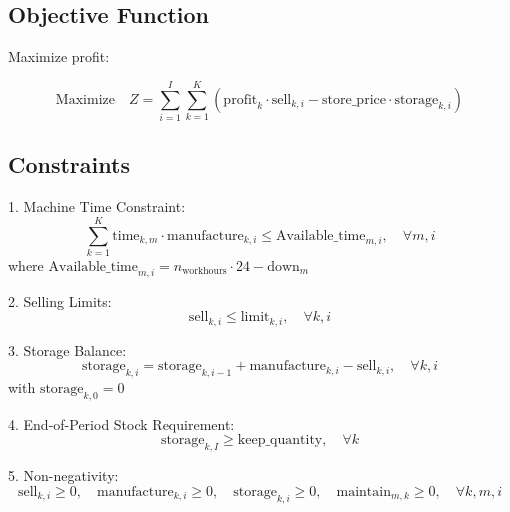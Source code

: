 \documentclass{article}
\begin{document}
\subsection*{Objective Function}
Maximize profit:

\[
\text{Maximize} \quad Z = \sum_{i=1}^{I} \sum_{k=1}^{K} \left( \text{profit}_k \cdot \text{sell}_{k,i} - \text{store\_price} \cdot \text{storage}_{k,i} \right)
\]

\subsection*{Constraints}
1. Machine Time Constraint:
\[
\sum_{k=1}^{K} \text{time}_{k,m} \cdot \text{manufacture}_{k,i} \leq \text{Available\_time}_{m,i}, \quad \forall m, i
\]
where \( \text{Available\_time}_{m,i} = n_{\text{workhours}} \cdot 24 - \text{down}_m \)

2. Selling Limits:
\[
\text{sell}_{k,i} \leq \text{limit}_{k,i}, \quad \forall k, i
\]

3. Storage Balance:
\[
\text{storage}_{k,i} = \text{storage}_{k,i-1} + \text{manufacture}_{k,i} - \text{sell}_{k,i}, \quad \forall k, i
\]
with \( \text{storage}_{k,0} = 0 \)

4. End-of-Period Stock Requirement:
\[
\text{storage}_{k,I} \geq \text{keep\_quantity}, \quad \forall k
\]

5. Non-negativity:
\[
\text{sell}_{k,i} \geq 0, \quad \text{manufacture}_{k,i} \geq 0, \quad \text{storage}_{k,i} \geq 0, \quad \text{maintain}_{m,k} \geq 0, \quad \forall k, m, i
\]
\end{document}
